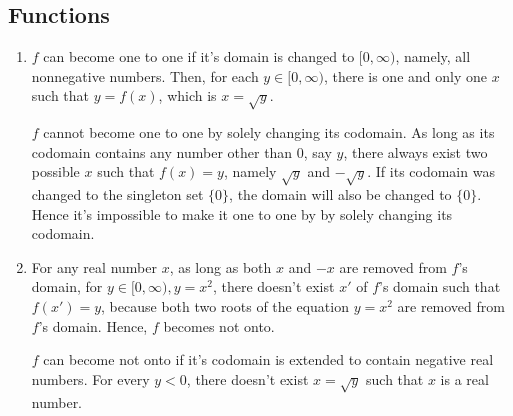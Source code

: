 \subsection{Functions}

\begin{exercise}{6}
  \begin{enumerate}
    \item
    $f$ can become one to one if it's domain is changed to $[0, \infty)$, namely, all nonnegative numbers. Then, for each $y \in [0, \infty)$, there is one and only one $x$ such that $y = f(x)$, which is $x = \sqrt{y}$.

    $f$ cannot become one to one by solely changing its codomain. As long as its codomain contains any number other than 0, say $y$, there always exist two possible $x$ such that $f(x) = y$, namely $\sqrt{y}$ and $-\sqrt{y}$. If its codomain was changed to the singleton set $\{0\}$, the domain will also be changed to $\{0\}$. Hence it's impossible to make it one to one by by solely changing its codomain.

    \item
    For any real number $x$, as long as both $x$ and $-x$ are removed from $f$'s domain, for $y \in [0, \infty), y = x^2$, there doesn't exist $x'$ of $f$'s domain such that $f(x') = y$, because both two roots of the equation $y = x^2$ are removed from $f$'s domain. Hence, $f$ becomes not onto.

    $f$ can become not onto if it's codomain is extended to contain negative real numbers. For every $y < 0$, there doesn't exist $x = \sqrt{y}$ such that $x$ is a real number.
  \end{enumerate}
\end{exercise}

